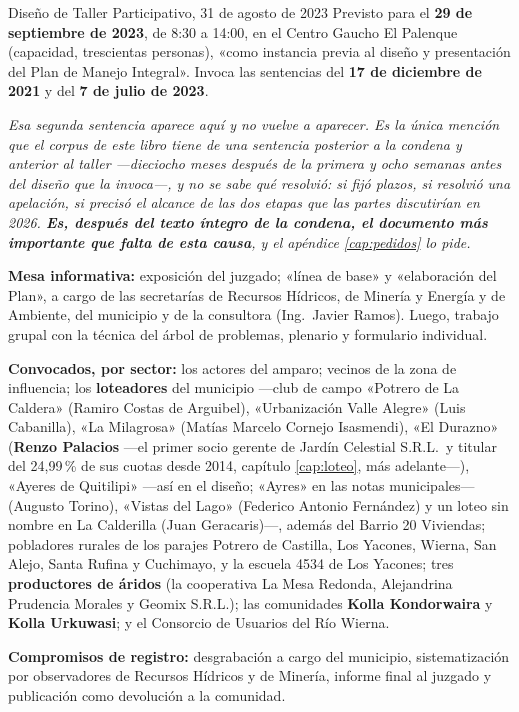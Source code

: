 \begin{ficha}{Diseño de Taller Participativo, 31 de agosto de 2023}
Previsto para el \textbf{29 de septiembre de 2023}, de 8:30 a 14:00, en el Centro Gaucho El Palenque (capacidad, trescientas personas), «como instancia previa al diseño y presentación del Plan de Manejo Integral». Invoca las sentencias del \textbf{17 de diciembre de 2021} y del \textbf{7 de julio de 2023}.

\textit{Esa segunda sentencia aparece aquí y no vuelve a aparecer. Es la única mención que el corpus de este libro tiene de una sentencia posterior a la condena y anterior al taller ---dieciocho meses después de la primera y ocho semanas antes del diseño que la invoca---, y no se sabe qué resolvió: si fijó plazos, si resolvió una apelación, si precisó el alcance de las dos etapas que las partes discutirían en 2026. \textbf{Es, después del texto íntegro de la condena, el documento más importante que falta de esta causa}, y el apéndice \ref{cap:pedidos} lo pide.}

\textbf{Mesa informativa:} exposición del juzgado; «línea de base» y «elaboración del Plan», a cargo de las secretarías de Recursos Hídricos, de Minería y Energía y de Ambiente, del municipio y de la consultora (Ing.\ Javier Ramos). Luego, trabajo grupal con la técnica del árbol de problemas, plenario y formulario individual.

\textbf{Convocados, por sector:} los actores del amparo; vecinos de la zona de influencia; los \textbf{loteadores} del municipio ---club de campo «Potrero de La Caldera» (Ramiro Costas de Arguibel), «Urbanización Valle Alegre» (Luis Cabanilla), «La Milagrosa» (Matías Marcelo Cornejo Isasmendi), «El Durazno» (\textbf{Renzo Palacios} ---el primer socio gerente de Jardín Celestial S.R.L.\ y titular del 24,99\,\% de sus cuotas desde 2014, capítulo \ref{cap:loteo}, más adelante---), «Ayeres de Quitilipi» ---así en el diseño; «Ayres» en las notas municipales--- (Augusto Torino), «Vistas del Lago» (Federico Antonio Fernández) y un loteo sin nombre en La Calderilla (Juan Geracaris)---, además del Barrio 20 Viviendas; pobladores rurales de los parajes Potrero de Castilla, Los Yacones, Wierna, San Alejo, Santa Rufina y Cuchimayo, y la escuela 4534 de Los Yacones; tres \textbf{productores de áridos} (la cooperativa La Mesa Redonda, Alejandrina Prudencia Morales y Geomix S.R.L.); las comunidades \textbf{Kolla Kondorwaira} y \textbf{Kolla Urkuwasi}; y el Consorcio de Usuarios del Río Wierna.

\textbf{Compromisos de registro:} desgrabación a cargo del municipio, sistematización por observadores de Recursos Hídricos y de Minería, informe final al juzgado y publicación como devolución a la comunidad.
\end{ficha}

